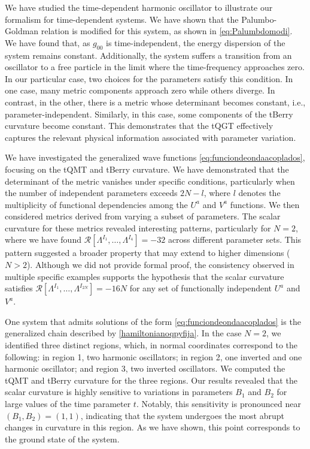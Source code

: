 \documentclass[12pt]{iopart}
\begin{document}
We have studied the time-dependent harmonic oscillator to illustrate our formalism for time-dependent systems. We have shown that the Palumbo-Goldman relation is modified for this system, as shown in \eqref{eq:Palumbdomodi}. We have found that, as $g_{00}$ is time-independent, the energy dispersion of the system remains constant. Additionally, the system suffers a transition from an oscillator to a free particle in the limit where the time-frequency approaches zero. In our particular case, two choices for the parameters satisfy this condition. In one case, many metric components approach zero while others diverge. In contrast, in the other, there is a metric whose determinant becomes constant, i.e., parameter-independent. Similarly, in this case, some components of the tBerry curvature become constant. This demonstrates that the tQGT effectively captures the relevant physical information associated with parameter variation.

We have investigated the generalized wave functions \eqref{eq:funciondeondaacoplados}, focusing on the tQMT and tBerry curvature. We have demonstrated that the determinant of the metric vanishes under specific conditions, particularly when the number of independent parameters exceeds $2N - l$, where $l$ denotes the multiplicity of functional dependencies among the $U^a$ and $V^a$ functions. We then considered metrics derived from varying a subset of parameters. The scalar curvature for these metrics revealed interesting patterns, particularly for $N = 2$, where we have found $\mathcal{R}[\Lambda^{I_1},\dots,\Lambda^{I_{4}}]=-32$ across different parameter sets. This pattern suggested a broader property that may extend to higher dimensions (\(N > 2\)). Although we did not provide formal proof, the consistency observed in multiple specific examples supports the hypothesis that the scalar curvature satisfies $\mathcal{R}[\Lambda^{I_1},\dots,\Lambda^{I_{2N}}]=-16N$ for any set of functionally independent $U^a$ and $V^a$.

One system that admits solutions of the form \eqref{eq:funciondeondaacoplados} is the generalized chain described by \eqref{hamiltonianoqpyfija}. In the case $N=2$, we identified three distinct regions, which, in normal coordinates correspond to the following: in region 1, two harmonic oscillators; in region 2, one inverted and one harmonic oscillator; and region 3, two inverted oscillators. We computed the tQMT and tBerry curvature for the three regions. Our results revealed that the scalar curvature is highly sensitive to variations in parameters $B_1$ and $B_2$ for large values of the time parameter $t$. Notably, this sensitivity is pronounced near $(B_1, B_2)=(1,1)$, indicating that the system undergoes the most abrupt changes in curvature in this region. As we have shown, this point corresponds to the ground state of the system. 
\end{document}
